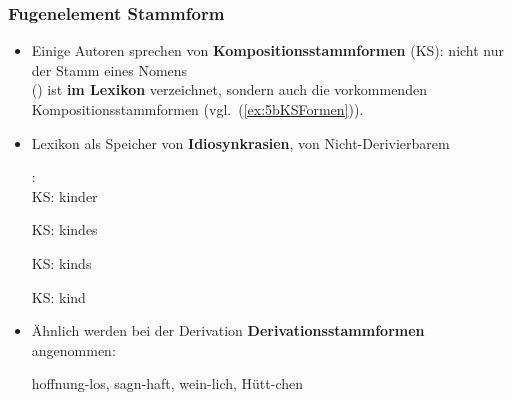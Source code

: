 \begin{frame}
\frametitle{Fugenelement \vs Stammform}

\begin{itemize}
	\item Einige Autoren \citep[vgl.][211ff; 227ff]{Eisenberg00a} sprechen von \textbf{Kompositionsstammformen} (KS): nicht nur der Stamm eines Nomens \\
	(\zB {}) ist \textbf{im Lexikon} verzeichnet, sondern auch die vorkommenden Kompositionsstammformen (vgl.\ (\ref{ex:5bKSFormen})).
	
	\item Lexikon als Speicher von \textbf{Idiosynkrasien}, \dash von Nicht-Derivierbarem
	
	\settowidth{} 
	\ea\label{ex:5bKSFormen} :\\
	KS: kinder  
	
	KS: kindes  
	
	KS: kinds 
	
	KS: kind 
	\z    
	
	\item Ähnlich werden bei der Derivation \textbf{Derivationsstammformen} angenommen:
	
	\ea hoffnung-los, sagn-haft, wein-lich, Hütt\alertred{\_}-chen
	\z

\end{itemize}

\end{frame}


